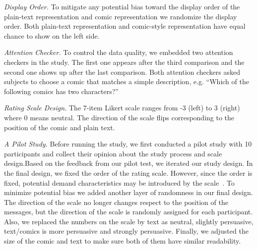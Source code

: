 \textit{Display Order.} To mitigate any potential bias toward the display order of the plain-text representation and comic representation we randomize the display order. Both plain-text representation and comic-style representation have equal chance to show on the left side.

\textit{Attention Checker.} To control the data quality, we embedded two attention checkers in the study. The first one appears after the third comparison and the second one shows up after the last comparison. Both attention checkers asked subjects to choose a comic that matches a simple description, e.g. ``Which of the following comics has two characters?''

\textit{Rating Scale Design.} The 7-item Likert scale ranges from -3 (left) to 3 (right) where 0 means neutral. The direction of the scale flips corresponding to the position of the comic and plain text.

\textit{A Pilot Study.} Before running the study, we first conducted a pilot study with 10 participants and collect their opinion about the study process and scale design.Based on the feedback from our pilot test, we iterated our study design. In the final design, we fixed the order of the rating scale. However, since the order is fixed, potential demand characteristics may be introduced by the scale~\cite{orne1962social}. To minimize potential bias we added another layer of randomness in our final design. The direction of the scale no longer changes respect to the position of the messages, but the direction of the scale is randomly assigned for each participant. Also, we replaced the numbers on the scale by text as neutral, slightly persuasive, text/comics is more persuasive and strongly persuasive. Finally, we adjusted the size of the comic and text to make sure both of them have similar readability.
%



